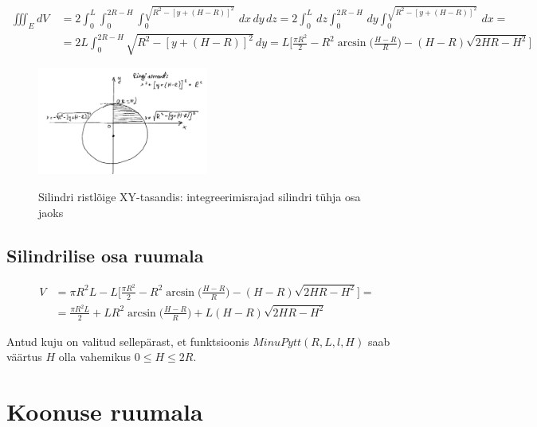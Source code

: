 \documentclass[a4paper]{article}
\begin{document}
\begin{equation} 
\begin{split}
\iiint_E dV\ & = 2 \int_{0}^{L}\int_{0}^{2R-H}\int_{0}^{\sqrt{R^2 - [y+(H-R)]^2}} \,dx\,dy\,dz = 2 \int_{0}^{L} \,dz \int_{0}^{2R-H} \,dy \int_{0}^{\sqrt{R^2 - [y+(H-R)]^2}} \,dx =\\ & =2 L \int_{0}^{2R-H} \sqrt{R^2 - [y+(H-R)]^2} \,dy = L\bigg[\frac{\pi R^2}{2} - R^2\arcsin\bigg(\frac{H-R}{R}\bigg)-(H-R)\sqrt{2 H R-H^2}\bigg]
\end{split}
\end{equation}

\begin{figure}[h]
\caption{Silindri ristlõige XY-tasandis: integreerimisrajad silindri tühja osa jaoks}
\centering
\includegraphics[width=0.5\textwidth]{silinder}
\label{fig:silinder}
\end{figure}

\subsection*{Silindrilise osa ruumala}
\begin{equation} 
\begin{split}
V & = \pi R^2 L - L\bigg[\frac{\pi R^2}{2} - R^2\arcsin\bigg(\frac{H-R}{R}\bigg)-(H-R)\sqrt{2 H R-H^2}\bigg]= \\ & = \frac{\pi R^2 L}{2} + L R^2\arcsin\bigg(\frac{H-R}{R}\bigg) + L (H-R)\sqrt{2 H R-H^2}
\end{split}
\end{equation}

 Antud kuju on valitud sellepärast, et funktsioonis $MinuPytt(R,L,l,H)$ saab väärtus $H$ olla vahemikus $0 \leq H \leq 2R$.

\vspace{7.5mm} %


\section*{Koonuse ruumala}
\end{document}

